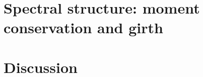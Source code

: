 \documentclass[preprint,12pt]{elsarticle}
\begin{document}
\section{Spectral structure: moment conservation and girth}
\label{sec:spectral}

%
%
%
%


\section{Discussion}
\label{sec:discussion}
\end{document}
